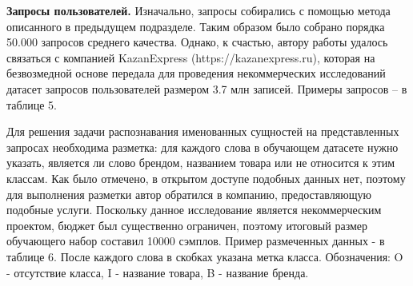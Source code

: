 \documentclass[12pt,a4paper]{article}
\begin{document}
\begin{table}[H]
\begin{center}
    \caption{Примеры товаров из даннных с соревнования DataFusion}
\end{center}
\end{table}

\textbf{Запросы пользователей.} Изначально, запросы собирались с помощью метода описанного в предыдущем подразделе. Таким образом было собрано порядка 50.000 запросов среднего качества. Однако, к счастью, автору работы удалось связаться с компанией KazanExpress (https://kazanexpress.ru), которая на безвозмедной основе передала для проведения некоммерческих исследований датасет запросов пользователей размером 3.7 млн записей. Примеры запросов -- в таблице 5.

\begin{table}[H]
\begin{center}
    \caption{Примеры запросов в поисковую систему KazanExpress}
\end{center}
\end{table}

\noindent Для решения задачи распознавания именованных сущностей на представленных запросах необходима разметка: для каждого слова в обучающем датасете нужно указать, является ли слово брендом, названием товара или не относится к этим классам. Как было отмечено, в открытом доступе подобных данных нет, поэтому для выполнения разметки автор обратился в компанию, предоставляющую подобные услуги. Поскольку данное исследование является некоммерческим проектом, бюджет был существенно ограничен, поэтому итоговый размер обучающего набор составил 10000 сэмплов. Пример размеченных данных - в таблице 6. После каждого слова в скобках указана метка класса. Обозначения: O - отсутствие класса, I - название товара, B - название бренда.
\end{document}
